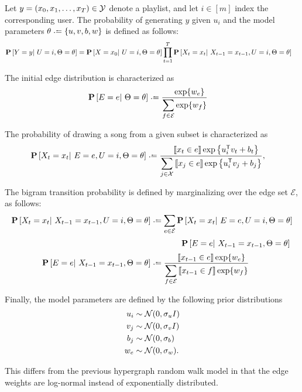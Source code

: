 \documentclass{article}
\def\E{\ensuremath{\mathcal{E}}}
\begin{document}
Let $y = (x_0, x_1, \dots, x_T) \in \mathcal{Y}$ denote a playlist, and let $i \in [m]$ index the corresponding user.
The probability of generating $y$ given $u_i$ and the model parameters $\theta \defeq \{u, v, b, w\}$ is defined as follows:
\begin{align*}
\mathbf{P}\left[Y = y |~ U = i, \Theta = \theta \right] &= \mathbf{P}\left[X = x_0 |~ U = i, \Theta = \theta\right]
\prod_{t=1}^{T} \mathbf{P}\left[X_t = x_t |~ X_{t-1}=x_{t-1}, U=i, \Theta=\theta \right]
\end{align*}

The initial edge distribution is characterized as
\begin{align*}
\P\left[E = e \given \Theta = \theta\right] & \defeq \frac{\phantom\sum \exp\{w_e\}}{\displaystyle\sum_{f\in \E} \exp\{w_f\}}
\end{align*}

The probability of drawing a song from a given subset is characterized as
\begin{align*}
\P\left[X_t=x_t \given E=e, U=i, \Theta=\theta \right] &\defeq 
\frac{\phantom\sum\ind{x_t \in e}\exp\left\{u_i\trans v_t + b_t\right\}}{\displaystyle\sum_{j \in \X}\ind{x_j \in e} \exp\left\{u_i\trans v_j + b_j\right\}},
\end{align*}

The bigram transition probability is defined by marginalizing over the edge set $\E$, as follows:
\begin{align*}
\P\left[X_{t}= x_t \given X_{t-1}=x_{t-1}, U=i, \Theta=\theta \right] &\defeq \sum_{e \in \E} 
\P\left[X_{t}=x_t \given E=e, U=i, \Theta=\theta\right]\\
&\phantom{\defeq \sum}\quad\P\left[E=e \given X_{t-1} = x_{t-1}, \Theta=\theta\right]\\
\P\left[E=e \given X_{t-1}=x_{t-1}, \Theta=\theta\right] &\defeq \frac{\phantom\sum\ind{x_{t-1}\in e}\exp\{w_e\}}{ \displaystyle\sum_{f \in \E} \ind{x_{t-1} \in f} \exp\{w_f\} }
\end{align*}

Finally, the model parameters are defined by the following prior distributions
\begin{align*}
u_i &\sim \mathcal{N}(0, \sigma_u I)\\
v_j &\sim \mathcal{N}(0, \sigma_v I)\\
b_j &\sim \mathcal{N}(0, \sigma_b)\\
w_e &\sim \mathcal{N}(0, \sigma_w).\\
\end{align*}

This differs from the previous hypergraph random walk model in that the edge weights are log-normal instead of
exponentially distributed.  
\end{document}
